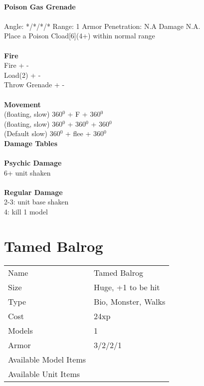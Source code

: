 \ \\
{\bf Poison Gas Grenade } \\
\ \\
Angle: */*/*/* Range: 1 Armor Penetration: N.A Damage N.A. \\
\indent Place a Poison Cload[6](4+) within normal range \\





\ \\ {\bf Fire } \\
Fire + - \\
Load(2) + - \\
Throw Grenade + - \\
\ \\ {\bf Movement } \\
(floating, slow) 360$^0$ + F + 360$^0$ \\
(floating, slow) 360$^0$ + 360$^0$ + 360$^0$ \\
(Default slow) 360$^0$ + flee + 360$^0$ \\



{\bf Damage Tables} \\
\ \\ {\bf Psychic Damage } \\
6+ unit shaken \\
\ \\ {\bf Regular Damage } \\
2-3: unit base shaken \\
4: kill 1 model \\









\pagebreak

\section{ Tamed Balrog }

\begin{tabular}{ll}
  Name & Tamed Balrog \\
  Size & Huge, +1 to be hit\\
  Type & Bio, Monster, Walks\\
  Cost & 24xp\\
  Models & 1\\
  Armor & 3/2/2/1\\
  Available Model Items &  \\
  Available Unit Items &  \\
\end{tabular}

